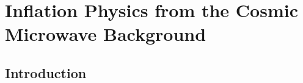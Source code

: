  
\chapter{Inflation Physics from the Cosmic Microwave Background}
\renewcommand*\thesection{\arabic{section}}

\def\gtrsim{\raise-.75ex\hbox{$\buildrel>\over\sim$}}

\section{Introduction}

